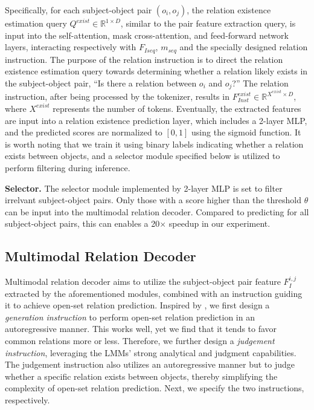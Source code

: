 Specifically, for each subject-object pair $(o_i, o_j)$, the relation existence estimation query $Q^{exist} \in \mathbb{R}^{1 \times D}$, similar to the pair feature extraction query, is input into the self-attention, mask cross-attention, and feed-forward network layers, interacting respectively with $F_{Iseq}$, $m_{seq}$ and the specially designed relation instruction.
The purpose of the relation instruction is to direct the relation existence estimation query towards determining whether a relation likely exists in the subject-object pair, \eg ``Is there a relation between $o_i$ and $o_j$?''
The relation instruction, after being processed by the tokenizer, results in $F_{Inst}^{exist} \in \mathbb{R}^{X^{exist} \times D}$, where $X^{exist}$ represents the number of tokens.
Eventually, the extracted features are input into a relation existence prediction layer, which includes a 2-layer MLP, and the predicted scores are normalized to $[0, 1]$ using the sigmoid function.
It is worth noting that we train it using binary labels indicating whether a relation exists between objects, and a selector module specified below is utilized to perform filtering during inference.

\textbf{Selector.}
The selector module implemented by 2-layer MLP is set to filter irrelvant subject-object pairs.
Only those with a score higher than the threshold $\theta$ can be input into the multimodal relation decoder.
Compared to predicting for all subject-object pairs, this can enables a 20$\times$ speedup in our experiment.


\subsection{Multimodal Relation Decoder}
\label{openpsg:sec:rel_decoder}
Multimodal relation decoder aims to utilize the subject-object pair feature $F_I^{i, j}$ extracted by the aforementioned modules, combined with an instruction guiding it to achieve open-set relation prediction.
Inspired by \citep{yue2023object, yu2023towards}, we first design a \textit{generation instruction} to perform open-set relation prediction in an autoregressive manner.
This works well, yet we find that it tends to favor common relations more or less.
Therefore, we further design a \textit{judgement instruction}, leveraging the LMMs' strong analytical and judgment capabilities.
The judgement instruction also utilizes an autoregressive manner but to judge whether a specific relation exists between objects, thereby simplifying the complexity of open-set relation prediction.
Next, we specify the two instructions, respectively.

